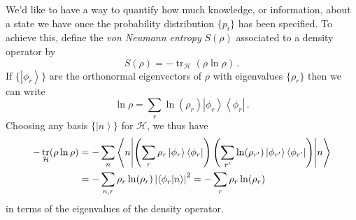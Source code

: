 \documentclass{article}
\theoremstyle{plain}\theoremheaderfont{\normalfont\itshape}\theorembodyfont{\rmfamily}\theoremseparator{.}\newtheorem*{rem}{Remark}\newtheorem*{ex}{Example}\newtheorem*{proof}{Proof}\newtheorem*{altp}{Alternative proof}
\theoremstyle{plain}\theoremheaderfont{\normalfont\bfseries}\theorembodyfont{\rmfamily}\theoremseparator{.}\newtheorem{thm}{Theorem}[section]\newtheorem{lem}[thm]{Lemma}\newtheorem{prop}[thm]{Proposition}\newtheorem*{cor}{Corollary}\newtheorem{defn}[thm]{Definition}\newtheorem{clm}[thm]{Claim}\newtheorem{clminproof}{Claim}
\theoremstyle{break}\theoremheaderfont{\normalfont\itshape}\theorembodyfont{\rmfamily}\theoremseparator{.\medskip}\newtheorem*{proofskip}{Proof}\newtheorem*{exs}{Examples}\newtheorem*{rems}{Remarks}
\theoremstyle{break}\theoremheaderfont{\normalfont\bfseries}\theorembodyfont{\rmfamily}\theoremseparator{.\medskip}\newtheorem{lemskip}[thm]{Lemma}\newtheorem{defnskip}[thm]{Definition}\newtheorem{propskip}[thm]{Proposition}\newtheorem{thmskip}[thm]{Theorem}
\numberwithin{equation}{section}
\newcommand{\bra}[1]{\left\langle #1 \right|}
\newcommand{\ket}[1]{\left| #1 \right\rangle}
\newcommand{\braket}[2]{\left\langle #1 \middle| #2 \right\rangle}
\newcommand{\expval}[2]{\left\langle #2 \middle| #1 \middle| #2 \right\rangle}
\newcommand{\abs}[1]{\left| #1 \right|}
\newcommand{\hb}{\mathcal{H}}
\DeclareMathOperator{\tr}{tr}
\begin{document}
    We'd like to have a way to quantify how much knowledge, or information, about a state we have once the probability distribution \(\{p_i\}\) has been specified. To achieve this, define the \textit{von Neumann entropy} \(S(\rho)\) associated to a density operator by
    \begin{equation}
        S(\rho)=-\tr_\hb(\rho\ln\rho)\,.
    \end{equation}
    If \(\{\ket{\phi_r}\}\) are the orthonormal eigenvectors of \(\rho\) with eigenvalues \(\{\rho_r\}\) then we can write
    \begin{equation}
        \ln\rho=\sum_r\ln(\rho_r)\ket{\phi_r}\bra{\phi_r}\,.
    \end{equation}
    Choosing any basis \(\{\ket{n}\}\) for \(\hb\), we thus have
    \begin{align}
        -\tr_\hb (\rho\ln\rho)&=-\sum_n\expval{\left(\sum_r\rho_r\ket{\phi_r}\bra{\phi_r}\right)\left(\sum_{r'}\ln(\rho_{r'})\ket{\phi_{r'}}\bra{\phi_{r'}}\right)}{n}\notag\\
        &=-\sum_{n,r}\rho_r\ln(\rho_r)\abs{\braket{\phi_r}{n}}^2=-\sum_r\rho_r\ln(\rho_r)\label{von_Neumann_entropy}
    \end{align}
    in terms of the eigenvalues of the density operator.
\end{document}
